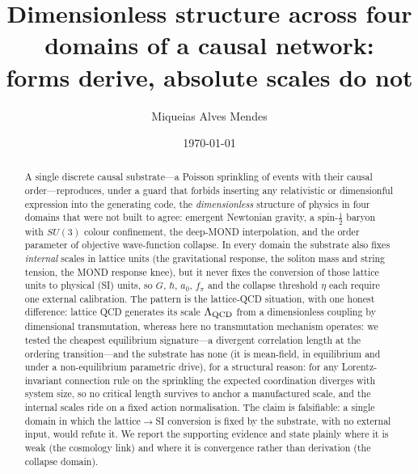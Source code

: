 \documentclass[aps,prl,reprint,nofootinbib,superscriptaddress,floatfix]{revtex4-2}
\begin{document}
\title{Dimensionless structure across four domains of a causal network:\\
forms derive, absolute scales do not}

\author{Miqueias Alves Mendes}
\date{\today}

\begin{abstract}
A single discrete causal substrate---a Poisson sprinkling of events with their causal
order---reproduces, under a guard that forbids inserting any relativistic or
dimensionful expression into the generating code, the \emph{dimensionless} structure of
physics in four domains that were not built to agree: emergent Newtonian gravity, a
spin-$\tfrac12$ baryon with $SU(3)$ colour confinement, the deep-MOND interpolation, and
the order parameter of objective wave-function collapse. In every domain the substrate
also fixes \emph{internal} scales in lattice units (the gravitational response, the
soliton mass and string tension, the MOND response knee), but it never fixes the
conversion of those lattice units to physical (SI) units, so $G$, $\hbar$, $a_0$, $f_\pi$
and the collapse threshold $\eta$ each require one external calibration. The pattern is
the lattice-QCD situation, with one honest difference: lattice QCD generates its scale
$\Lambda_{\rm QCD}$ from a dimensionless coupling by dimensional transmutation, whereas
here no transmutation mechanism operates: we tested the cheapest equilibrium signature---a
divergent correlation length at the ordering transition---and the substrate has none (it is
mean-field, in equilibrium and under a non-equilibrium parametric drive), for a structural
reason: for any Lorentz-invariant connection rule on the sprinkling the expected
coordination diverges with system size, so no critical length survives to anchor a
manufactured scale, and the internal scales ride on a fixed action normalisation. The claim is falsifiable: a single domain in which the
lattice$\to$SI conversion is fixed by the substrate, with no external input, would refute
it. We report the supporting evidence and state plainly where it is weak (the cosmology
link) and where it is convergence rather than derivation (the collapse domain).
\end{abstract}

\maketitle
\end{document}

